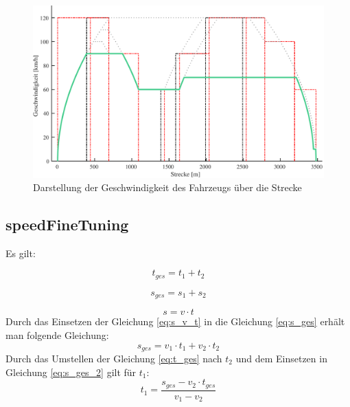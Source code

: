 \begin{figure}[H]
  \includegraphics[width=\linewidth]{../matlab/it_7.pdf}
  \caption{Darstellung der Geschwindigkeit des Fahrzeugs über die Strecke}
\end{figure}



\subsection{speedFineTuning}

Es gilt:

\begin{equation}
\label{eq:t_ges}
t_{ges} = t_{1} + t_{2}
\end{equation}

\begin{equation}
\label{eq:s_ges}
s_{ges} = s_{1} + s_{2}
\end{equation}

\begin{equation}
\label{eq:s_v_t}
s = v \cdot t
\end{equation}
Durch das Einsetzen der Gleichung \eqref{eq:s_v_t} in die Gleichung \eqref{eq:s_ges} erhält man folgende Gleichung:
\begin{equation}
\label{eq:s_ges_2}
s_{ges} = v_{1} \cdot t_{1} + v_{2} \cdot t_{2}
\end{equation}
Durch das Umstellen der Gleichung \eqref{eq:t_ges} nach $t_{2}$ und dem Einsetzen in Gleichung \eqref{eq:s_ges_2} gilt für $t_{1}$:
\begin{equation}
t_{1} = \frac{s_{ges} - v_{2} \cdot t_{ges}}{v_{1} - v_{2}}
\end{equation}












